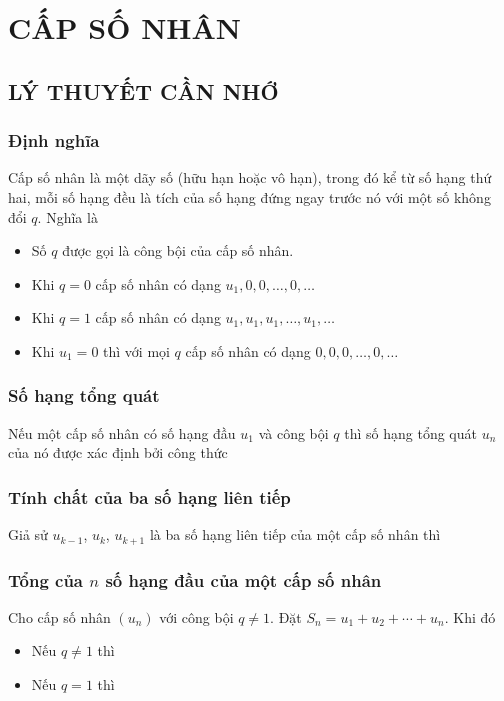 \section{CẤP SỐ NHÂN}
\subsection{LÝ THUYẾT CẦN NHỚ}
\subsubsection{Định nghĩa}
Cấp số nhân là một dãy số (hữu hạn hoặc vô hạn), trong đó kể từ số hạng thứ hai, mỗi số hạng đều là tích của số hạng đứng ngay trước nó với một số không đổi $q$. Nghĩa là
\begin{gachsoc}
	\begin{itemize}
		\item [$\bullet$] Số $q$ được gọi là công bội của cấp số nhân.
		\item [$\bullet$] Khi $q=0$ cấp số nhân có dạng ${{u}_{1}},0,0,\ldots,0,\ldots$
		\item [$\bullet$] Khi $q=1$ cấp số nhân có dạng ${{u}_{1}},{{u}_{1}},{{u}_{1}},\ldots,{{u}_{1}},\ldots$
		\item [$\bullet$] Khi ${{u}_{1}}=0$ thì với mọi $q$ cấp số nhân có dạng $0,0,0,\ldots,0,\ldots$
	\end{itemize}
\end{gachsoc}

\subsubsection{Số hạng tổng quát} 
	Nếu một cấp số nhân có số hạng đầu $u_1$ và công bội $q$ thì số hạng tổng quát $u_n$ của nó được xác định bởi công thức
\subsubsection{Tính chất của ba số hạng liên tiếp} 
Giả sử $u_{k-1}$, $u_k$, $u_{k+1}$ là ba số hạng liên tiếp của một cấp số nhân thì 
\subsubsection{Tổng của $ n $ số hạng đầu của một cấp số nhân}
Cho cấp số nhân $\left(u_n\right)$ với công bội $q \neq 1$. Đặt $S_n=u_1+u_2+\cdots+u_n$. Khi đó
\begin{itemize}
	\item [$\bullet$] Nếu $q \ne 1$ thì 
	\item [$\bullet$] Nếu $ q=1 $ thì 
\end{itemize}
\newpage
